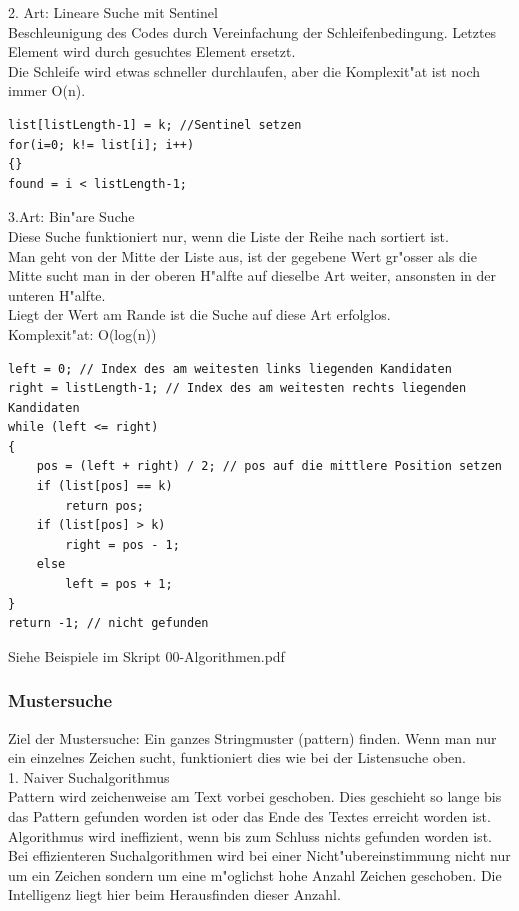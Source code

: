 2. Art: Lineare Suche mit Sentinel\\
Beschleunigung des Codes durch Vereinfachung der Schleifenbedingung. Letztes Element wird durch gesuchtes Element ersetzt.\\
Die Schleife wird etwas schneller durchlaufen, aber die Komplexit"at ist noch immer O(n).
\begin{lstlisting}[style=C]
list[listLength-1] = k; //Sentinel setzen
for(i=0; k!= list[i]; i++)
{}
found = i < listLength-1; 
\end{lstlisting} 

3.Art: Bin"are Suche\\
Diese Suche funktioniert nur, wenn die Liste der Reihe nach sortiert ist.\\
Man geht von der Mitte der Liste aus, ist der gegebene Wert gr"osser als die Mitte sucht man in der oberen H"alfte auf dieselbe Art weiter, ansonsten in der unteren H"alfte.\\
Liegt der Wert am Rande ist die Suche auf diese Art erfolglos.\\
Komplexit"at: O(log(n))\\
\begin{lstlisting}[style=C]
left = 0; // Index des am weitesten links liegenden Kandidaten
right = listLength-1; // Index des am weitesten rechts liegenden Kandidaten
while (left <= right)
{
	pos = (left + right) / 2; // pos auf die mittlere Position setzen
	if (list[pos] == k)
		return pos;
	if (list[pos] > k)
		right = pos - 1;
	else
		left = pos + 1;
}
return -1; // nicht gefunden

\end{lstlisting} 
Siehe Beispiele im Skript 00-Algorithmen.pdf

\subsubsection{Mustersuche}
Ziel der Mustersuche: Ein ganzes Stringmuster (pattern) finden. Wenn man nur ein einzelnes Zeichen sucht, funktioniert dies wie bei der Listensuche oben.\\
1. Naiver Suchalgorithmus\\
Pattern wird zeichenweise am Text vorbei geschoben. Dies geschieht so lange bis das Pattern gefunden worden ist oder das Ende des Textes erreicht worden ist. Algorithmus wird ineffizient, wenn bis zum Schluss nichts gefunden worden ist.\\
Bei effizienteren Suchalgorithmen wird bei einer Nicht"ubereinstimmung nicht nur um ein Zeichen sondern um eine m"oglichst hohe Anzahl Zeichen geschoben. Die Intelligenz liegt hier beim Herausfinden dieser Anzahl.\\



